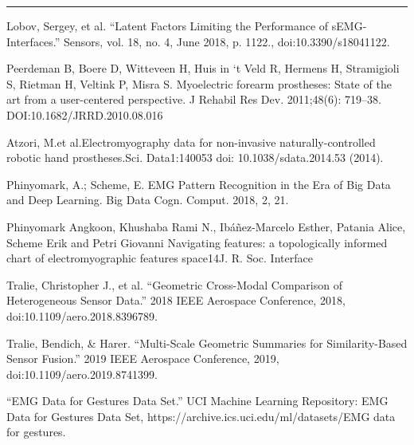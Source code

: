 \documentclass[11pt]{article}
\begin{document}
\begin{center}
\noindent\rule{16cm}{0.4pt}
\end{center}


\begin{thebibliography}{5}

 Lobov, Sergey, et al. “Latent Factors Limiting the Performance of sEMG-Interfaces.” Sensors, vol. 18, no. 4, June 2018, p. 1122., doi:10.3390/s18041122.

 Peerdeman  B,  Boere  D,  Witteveen  H,  Huis  in  ‘t  Veld  R,  Hermens H, Stramigioli S, Rietman H, Veltink P, Misra S. Myoelectric  forearm  prostheses:  State  of  the  art  from  a  user-centered perspective. J Rehabil Res Dev. 2011;48(6): 719–38. DOI:10.1682/JRRD.2010.08.016

 Atzori, M.et al.Electromyography data for non-invasive naturally-controlled robotic hand prostheses.Sci. Data1:140053 doi: 10.1038/sdata.2014.53 (2014).

 Phinyomark, A.; Scheme, E. EMG Pattern Recognition in the Era of Big Data and Deep Learning. Big Data Cogn. Comput. 2018, 2, 21. 

 Phinyomark Angkoon, Khushaba Rami N., Ibáñez-Marcelo Esther, Patania Alice, Scheme Erik and Petri Giovanni Navigating features: a topologically informed chart of electromyographic features space14J. R. Soc. Interface

 Tralie, Christopher J., et al. “Geometric Cross-Modal Comparison of Heterogeneous Sensor Data.” 2018 IEEE Aerospace Conference, 2018, doi:10.1109/aero.2018.8396789.

 Tralie, Bendich, \& Harer. “Multi-Scale Geometric Summaries for Similarity-Based Sensor Fusion.” 2019 IEEE Aerospace Conference, 2019, doi:10.1109/aero.2019.8741399.

 “EMG Data for Gestures Data Set.” UCI Machine Learning Repository: EMG Data for Gestures Data Set, https://archive.ics.uci.edu/ml/datasets/EMG data for gestures.

\end{thebibliography}
  
\end{document}
